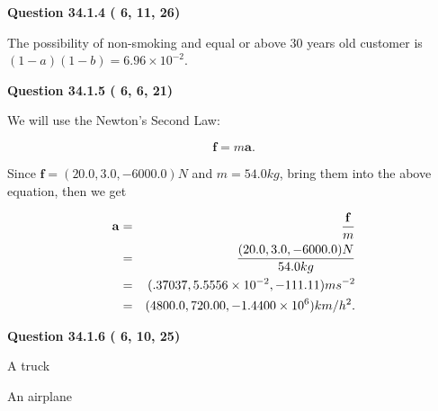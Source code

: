 \documentclass[12pt]{article}
\begin{document}
\vspace{0.2in}
  
{\textbf{\Large{Question
34.1.4 
 (          6,         11,         26)
}}}
  
  
 
 
\noindent{}

The possibility of  %
 non-smoking and  %
equal or above 30 years old
customer is $ (1-a)(1-b) =  %
6.96 \times 10^{-2} $.
 
 
  
\vspace{0.2in}
  
{\textbf{\Large{Question
34.1.5 
 (          6,          6,         21)
}}}
  
  
 
 
\noindent{}

We will use the Newton's Second Law:
 
\[
\mathbf{f}=m\mathbf{a}.
\]
 
Since $\mathbf{f}=( %
20.0,  %
3.0,  %
-6000.0 )N$
and $m= %
54.0 kg$, bring them into the above equation, then we get
 
\begin{eqnarray*}
\mathbf{a}&=&\frac{\mathbf{f}}m  \\
&=&\frac{(
20.0 ,
3.0 ,
-6000.0 )N
}{ %
54.0 kg}  \\
&=&(
.37037 ,
5.5556 \times 10^{-2},
-111.11
)ms^{-2} \\
&=&(
4800.0 ,
720.00 ,
-1.4400 \times 10^{6}
)km/h^2.
\end{eqnarray*}
 
 
 
  
\vspace{0.2in}
  
{\textbf{\Large{Question
34.1.6 
 (          6,         10,         25)
}}}
  
  
 
 
\noindent{}
 
 
A truck
 
 
An airplane
 
 
 
 
  
\vspace{0.2in}
  
\end{document}
